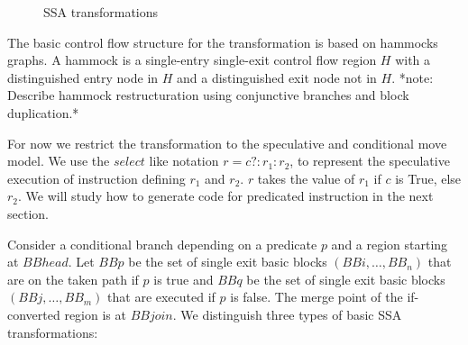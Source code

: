 \begin{figure}[h]
\centering

\caption{SSA transformations}
\label{fig: phi_operations}
\end{figure}

The basic control flow structure for the transformation is based on hammocks graphs. A hammock is a single-entry single-exit control flow region $H$ with a distinguished entry node in $H$ and a distinguished exit node not in $H$. *note: Describe hammock restructuration using conjunctive branches and block duplication.*

For now we restrict the transformation to the speculative and conditional move model. We use the $select$ like notation $r=c?:r_1:r_2$, to represent the speculative execution of instruction defining $r_1$ and $r_2$. $r$ takes the value of $r_1$ if $c$ is True, else $r_2$. We will study how to generate code for predicated instruction in the next section.

Consider a conditional branch depending on a predicate $p$ and a region starting at $BBhead$. Let $BBp$ be the set of single exit basic blocks $(BBi,\dots,BB_n)$ that are on the taken path if $p$ is true and $BBq$ be the set of single exit basic blocks $(BBj,\dots,BB_m)$ that are executed if $p$ is false. The merge point of the if-converted region is at $BBjoin$. We distinguish three types of basic SSA transformations:

